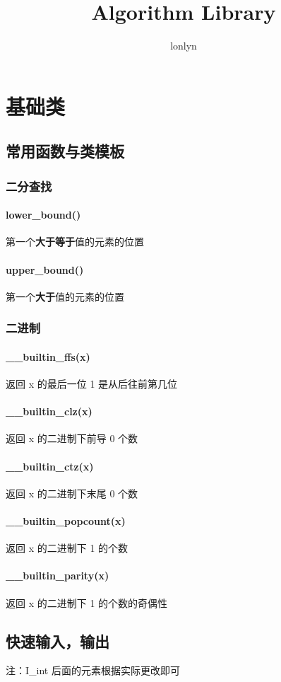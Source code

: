 \documentclass[a4paper,11pt]{article}
\author{lonlyn}
\title{Algorithm Library}
\begin{document}
 
\maketitle %
\newpage %
\tableofcontents %
\newpage
\setcounter{page}{1}
\section{基础类} 
\subsection{常用函数与类模板}
\subsubsection{二分查找}
\paragraph{lower\_bound()}
第一个\textbf{大于等于}值的元素的位置
\paragraph{upper\_bound()}
第一个\textbf{大于}值的元素的位置
\subsubsection{二进制}
\paragraph{\_\_builtin\_ffs(x)}
返回 x 的最后一位 1 是从后往前第几位
\paragraph{\_\_builtin\_clz(x)}
返回 x 的二进制下前导 0 个数
\paragraph{\_\_builtin\_ctz(x)}
返回 x 的二进制下末尾 0 个数
\paragraph{\_\_builtin\_popcount(x)}
返回 x 的二进制下 1 的个数
\paragraph{\_\_builtin\_parity(x)}
返回 x 的二进制下 1 的个数的奇偶性
\subsection{快速输入，输出} %
注：I\_int 后面的元素根据实际更改即可
\inputminted[linenos]{c++}{basic/inout.cpp}
\end{document}
